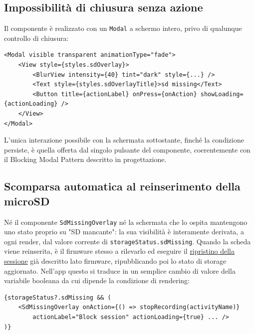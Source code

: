 \subsection{Impossibilità di chiusura senza azione}
Il componente è realizzato con un \texttt{Modal} a schermo intero, privo di
qualunque controllo di chiusura:

\begin{listing}[H]
\begin{verbatim}
<Modal visible transparent animationType="fade">
    <View style={styles.sdOverlay}>
        <BlurView intensity={40} tint="dark" style={...} />
        <Text style={styles.sdOverlayTitle}>sd missing</Text>
        <Button title={actionLabel} onPress={onAction} showLoading={actionLoading} />
    </View>
</Modal>
\end{verbatim}
\caption{Overlay bloccante senza via di chiusura alternativa}
\label{listing:sdmissing-modal}
\end{listing}

L'unica interazione possibile con la schermata sottostante, finché la
condizione persiste, è quella offerta dal singolo pulsante del componente,
coerentemente con il Blocking Modal Pattern descritto in progettazione.

\subsection{Scomparsa automatica al reinserimento della microSD}
Né il componente \texttt{SdMissingOverlay} né la schermata che lo ospita mantengono uno stato proprio su "SD mancante": la sua visibilità è
interamente derivata, a ogni render, dal valore corrente di \texttt{storageStatus.sdMissing}. Quando la scheda viene reinserita, è il firmware
stesso a rilevarlo ed eseguire il \hyperref[subsec:Recovery]{ripristino della sessione} già descritto lato firmware, ripubblicando poi lo stato di storage aggiornato.
Nell'app questo si traduce in un semplice cambio di valore della variabile booleana da cui dipende la condizione di rendering:

\begin{listing}[H]
\begin{verbatim}
{storageStatus?.sdMissing && (
    <SdMissingOverlay onAction={() => stopRecording(activityName)}
        actionLabel="Block session" actionLoading={true} ... />
)}
\end{verbatim}
\caption{L'overlay scompare da solo non appena la condizione diventa falsa}
\label{listing:sdmissing-autoresume}
\end{listing}

